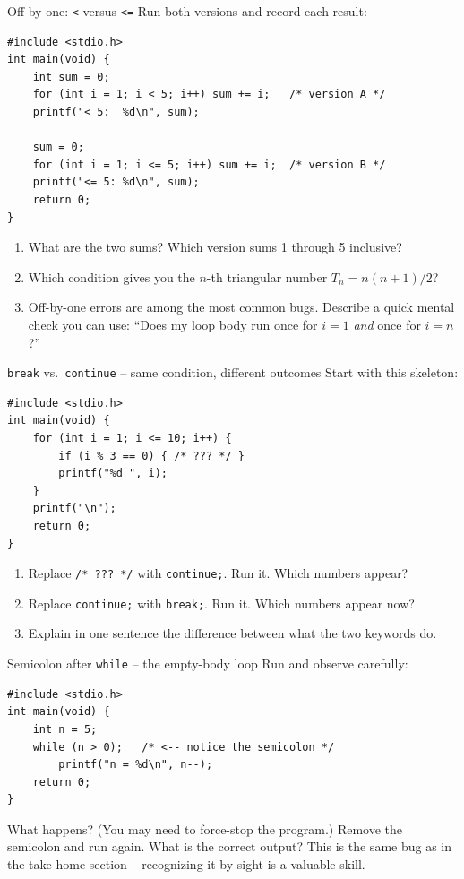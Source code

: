 \documentclass[11pt]{article}
\begin{document}
\begin{tryit}{Off-by-one: \texttt{<} versus \texttt{<=}}
Run both versions and record each result:
\begin{lstlisting}
#include <stdio.h>
int main(void) {
    int sum = 0;
    for (int i = 1; i < 5; i++) sum += i;   /* version A */
    printf("< 5:  %d\n", sum);

    sum = 0;
    for (int i = 1; i <= 5; i++) sum += i;  /* version B */
    printf("<= 5: %d\n", sum);
    return 0;
}
\end{lstlisting}
\begin{enumerate}[nosep,leftmargin=*]
  \item What are the two sums? Which version sums 1 through 5 inclusive?
  \item Which condition gives you the \(n\)-th triangular number $T_n = n(n+1)/2$?
  \item Off-by-one errors are among the most common bugs. Describe a quick mental check
        you can use: ``Does my loop body run once for $i = 1$ \emph{and} once for $i = n$?''
\end{enumerate}
\end{tryit}

\begin{tryit}{\texttt{break} vs.\ \texttt{continue} -- same condition, different outcomes}
Start with this skeleton:
\begin{lstlisting}
#include <stdio.h>
int main(void) {
    for (int i = 1; i <= 10; i++) {
        if (i % 3 == 0) { /* ??? */ }
        printf("%d ", i);
    }
    printf("\n");
    return 0;
}
\end{lstlisting}
\begin{enumerate}[nosep,leftmargin=*]
  \item Replace \texttt{/\!* ??? *\!/} with \texttt{continue;}. Run it. Which numbers appear?
  \item Replace \texttt{continue;} with \texttt{break;}. Run it. Which numbers appear now?
  \item Explain in one sentence the difference between what the two keywords do.
\end{enumerate}
\end{tryit}

\begin{tryit}{Semicolon after \texttt{while} -- the empty-body loop}
Run and observe carefully:
\begin{lstlisting}
#include <stdio.h>
int main(void) {
    int n = 5;
    while (n > 0);   /* <-- notice the semicolon */
        printf("n = %d\n", n--);
    return 0;
}
\end{lstlisting}
What happens? (You may need to force-stop the program.)
Remove the semicolon and run again. What is the correct output?
This is the same bug as in the take-home section -- recognizing it by sight is a valuable skill.
\end{tryit}
\end{document}
